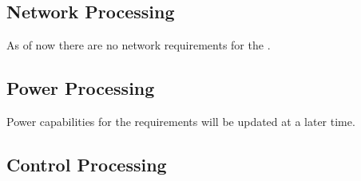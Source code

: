 


\newpage
\subsection{Network Processing}
\label{loc:Capability_Network}

As of now there are no network requirements for the \ThisSystem.
% 


\newpage
\subsection{Power Processing}
\label{loc:Capability_Power}

Power capabilities for the \ThisSystem requirements will be updated at a later time.



\newpage
\subsection{Control Processing}
\label{loc:Capability_Control}

